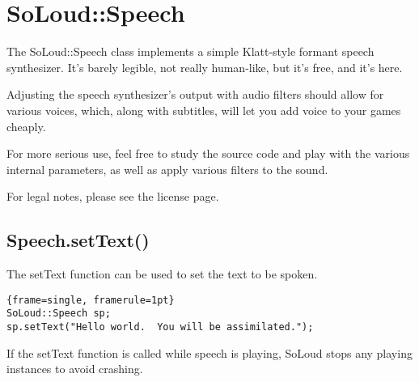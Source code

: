 
\chapter{SoLoud::Speech}

The SoLoud::Speech class implements a simple Klatt-style formant speech synthesizer. It's barely legible, not really human-like, but it's free, and it's here.

Adjusting the speech synthesizer's output with audio filters should allow for various voices, which, along with subtitles, will let you add voice to your games cheaply.

For more serious use, feel free to study the source code and play with the various internal parameters, as well as apply various filters to the sound.

For legal notes, please see the license page.

\section{Speech.setText()}

The setText function can be used to set the text to be spoken.

\begin{lstlisting}{frame=single, framerule=1pt}
SoLoud::Speech sp;
sp.setText("Hello world.  You will be assimilated.");
\end{lstlisting}

If the setText function is called while speech is playing, SoLoud stops any playing instances to avoid crashing.